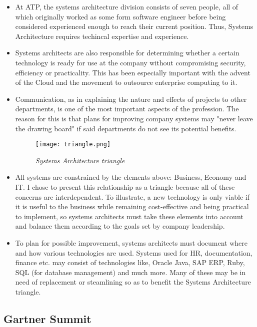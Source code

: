 \begin{itemize}
    \item At ATP, the systems architecture division consists of seven people, all of which originally worked as some form software engineer before being considered experienced enough to reach their current position. Thus, Systems Architecture requires techincal expertise and experience.
    \item Systems architects are also responsible for determining whether a certain technology is ready for use at the company without compromising security, efficiency or practicality. This has been especially important with the advent of the Cloud and the movement to outsource enterprise computing to it.
    \item Communication, as in explaining the nature and effects of projects to other departments, is one of the most important aspects of the profession. The reason for this is that plans for improving company systems may "never leave the drawing board" if said departments do not see its potential benefits.

    \begin{figure}[H]
        \centering
            \texttt{[image: triangle.png]}
            \caption*{\textit{Systems Architecture triangle}}
    \end{figure}

    \item All systems are constrained by the elements above: Business, Economy and IT. I chose to present this relationship as a triangle because all of these concerns are interdependent. To illustrate, a new technology is only viable if it is useful to the business while remaining cost-effective and being practical to implement, so systems architects must take these elements into account and balance them according to the goals set by company leadership. 
    \item To plan for possible improvement, systems architects must document where and how various technologies are used. Systems used for HR, documentation, finance etc. may consist of technologies like, Oracle Java, SAP ERP, Ruby, SQL (for database management) and much more. Many of these may be in need of replacement or steamlining so as to benefit the Systems Architecture triangle.
\end{itemize}


\subsection{Gartner Summit}

